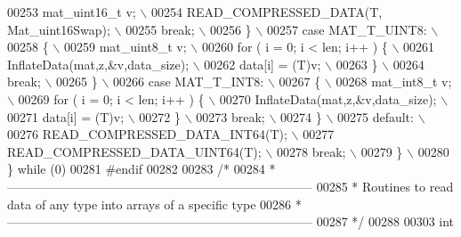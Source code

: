 \begin{DoxyCode}
00253 \textcolor{preprocessor}{                mat\_uint16\_t v; \(\backslash\)}
00254 \textcolor{preprocessor}{                READ\_COMPRESSED\_DATA(T, Mat\_uint16Swap); \(\backslash\)}
00255 \textcolor{preprocessor}{                break; \(\backslash\)}
00256 \textcolor{preprocessor}{            \} \(\backslash\)}
00257 \textcolor{preprocessor}{            case MAT\_T\_UINT8: \(\backslash\)}
00258 \textcolor{preprocessor}{            \{ \(\backslash\)}
00259 \textcolor{preprocessor}{                mat\_uint8\_t v; \(\backslash\)}
00260 \textcolor{preprocessor}{                for ( i = 0; i < len; i++ ) \{ \(\backslash\)}
00261 \textcolor{preprocessor}{                    InflateData(mat,z,&v,data\_size); \(\backslash\)}
00262 \textcolor{preprocessor}{                    data[i] = (T)v; \(\backslash\)}
00263 \textcolor{preprocessor}{                \} \(\backslash\)}
00264 \textcolor{preprocessor}{                break; \(\backslash\)}
00265 \textcolor{preprocessor}{            \} \(\backslash\)}
00266 \textcolor{preprocessor}{            case MAT\_T\_INT8: \(\backslash\)}
00267 \textcolor{preprocessor}{            \{ \(\backslash\)}
00268 \textcolor{preprocessor}{                mat\_int8\_t v; \(\backslash\)}
00269 \textcolor{preprocessor}{                for ( i = 0; i < len; i++ ) \{ \(\backslash\)}
00270 \textcolor{preprocessor}{                    InflateData(mat,z,&v,data\_size); \(\backslash\)}
00271 \textcolor{preprocessor}{                    data[i] = (T)v; \(\backslash\)}
00272 \textcolor{preprocessor}{                \} \(\backslash\)}
00273 \textcolor{preprocessor}{                break; \(\backslash\)}
00274 \textcolor{preprocessor}{            \} \(\backslash\)}
00275 \textcolor{preprocessor}{            default: \(\backslash\)}
00276 \textcolor{preprocessor}{                READ\_COMPRESSED\_DATA\_INT64(T); \(\backslash\)}
00277 \textcolor{preprocessor}{                READ\_COMPRESSED\_DATA\_UINT64(T); \(\backslash\)}
00278 \textcolor{preprocessor}{                break; \(\backslash\)}
00279 \textcolor{preprocessor}{        \} \(\backslash\)}
00280 \textcolor{preprocessor}{    \} while (0)}
00281 \textcolor{preprocessor}{#endif}
00282 
00283 \textcolor{comment}{/*}
00284 \textcolor{comment}{ * --------------------------------------------------------------------------}
00285 \textcolor{comment}{ *    Routines to read data of any type into arrays of a specific type}
00286 \textcolor{comment}{ * --------------------------------------------------------------------------}
00287 \textcolor{comment}{ */}
00288 
00303 \textcolor{keywordtype}{int}

\end{DoxyCode}
